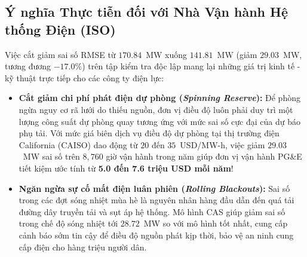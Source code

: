 \subsection{Ý nghĩa Thực tiễn đối với Nhà Vận hành Hệ thống Điện (ISO)}
Việc cắt giảm sai số RMSE từ $170.84$~MW xuống $141.81$~MW (giảm $29.03$~MW, tương đương $-17.0\%$) trên tập kiểm tra độc lập mang lại những giá trị kinh tế - kỹ thuật trực tiếp cho các công ty điện lực:
\begin{itemize}
    \item \textbf{Cắt giảm chi phí phát điện dự phòng (\textit{Spinning Reserve}):} Để phòng ngừa nguy cơ rã lưới do thiếu nguồn, đơn vị điều độ luôn phải duy trì một lượng công suất dự phòng quay tương ứng với mức sai số cực đại của dự báo phụ tải. Với mức giá biên dịch vụ điều độ dự phòng tại thị trường điện California (CAISO) dao động từ $20$ đến $35$~USD/MW-h, việc giảm $29.03$~MW sai số trên $8,760$ giờ vận hành trong năm giúp đơn vị vận hành PG\&E tiết kiệm ước tính từ \textbf{5.0 đến 7.6 triệu USD mỗi năm}!
    \item \textbf{Ngăn ngừa sự cố mất điện luân phiên (\textit{Rolling Blackouts}):} Sai số trong các đợt sóng nhiệt mùa hè là nguyên nhân hàng đầu dẫn đến quá tải đường dây truyền tải và sụt áp hệ thống. Mô hình CAS giúp giảm sai số trong chế độ sóng nhiệt tới $28.72$~MW so với mô hình tốt nhất, cung cấp cảnh báo sớm tin cậy để điều độ nguồn phát kịp thời, bảo vệ an ninh cung cấp điện cho hàng triệu người dân.
\end{itemize}
